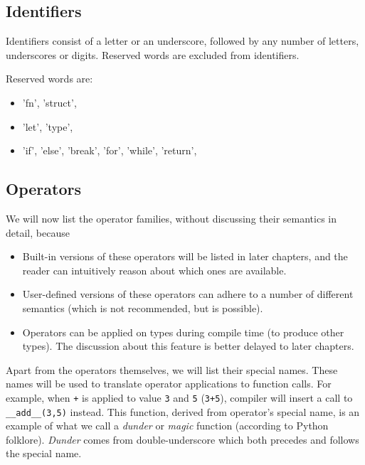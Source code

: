 \documentclass[times, utf8, diplomski]{fer}
\theoremstyle{definition}
\begin{document}
\subsection{Identifiers}

Identifiers consist of a letter or an underscore, followed by any number of letters, underscores or digits.
Reserved words are excluded from identifiers.

Reserved words are:
\begin{itemize}
    \item 'fn', 'struct',
    \item 'let', 'type',
    \item 'if', 'else', 'break', 'for', 'while', 'return',
\end{itemize}


\subsection{Operators}

We will now list the operator families, without discussing their semantics in detail, because

\begin{itemize}
    \item Built-in versions of these operators will be listed in later chapters, and the reader
        can intuitively reason about which ones are available.
    \item User-defined versions of these operators can adhere to a number of different semantics 
        (which is not recommended, but is possible).
    \item Operators can be applied on types during compile time (to produce other types). 
        The discussion about this feature is better delayed to later chapters.
\end{itemize}

Apart from the operators themselves, we will list their special names. These names
will be used to translate operator applications to function calls. For example, when 
\texttt{+} is applied to value \texttt{3} and \texttt{5} (\texttt{3+5}), compiler
will insert a call to \texttt{\_\_add\_\_(3,5)} instead. This function, derived from operator's special name,
is an example of what we call a \textit{dunder} or \textit{magic} function (according to Python folklore).
\textit{Dunder} comes from double-underscore which both precedes and follows the special name.
\end{document}
